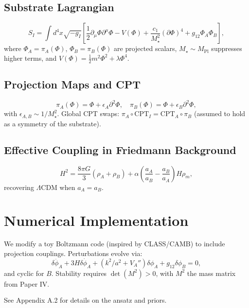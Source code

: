 \documentclass[11pt,a4paper]{article}
\begin{document}
\subsection{Substrate Lagrangian}
\begin{equation}
S_I = \int d^4x \sqrt{-g_I} \left[ \frac{1}{2} \partial_\mu \Phi \partial^\mu \Phi - V(\Phi) + \frac{c_1}{M_\star^2} (\partial \Phi)^4 + g_{12} \Phi_A \Phi_B \right],
\end{equation}
where $\Phi_A = \pi_A(\Phi)$, $\Phi_B = \pi_B(\Phi)$ are projected scalars, $M_\star \sim M_\mathrm{Pl}$ suppresses higher terms, and $V(\Phi) = \frac{1}{2} m^2 \Phi^2 + \lambda \Phi^4$.

\subsection{Projection Maps and CPT}
\begin{equation}
\pi_A(\Phi) = \Phi + \epsilon_A \partial^2 \Phi, \quad \pi_B(\Phi) = \Phi + \epsilon_B \partial^2 \Phi,
\end{equation}
with $\epsilon_{A,B} \sim 1/M_\star^2$. Global CPT swaps: $\pi_A \circ \mathrm{CPT}_I = \mathrm{CPT}_A \circ \pi_B$ (assumed to hold as a symmetry of the substrate).

\subsection{Effective Coupling in Friedmann Background}
\begin{equation}
H^2 = \frac{8\pi G}{3} (\rho_A + \rho_B) + \alpha \left( \frac{a_A}{a_B} - \frac{a_B}{a_A} \right) H \rho_m,
\end{equation}
recovering $\Lambda$CDM when $a_A = a_B$.

\section{Numerical Implementation}
We modify a toy Boltzmann code (inspired by CLASS/CAMB) to include projection couplings. Perturbations evolve via:
\begin{equation}
\ddot{\delta\phi_A} + 3H \dot{\delta\phi_A} + (k^2/a^2 + V_A'') \delta\phi_A + g_{12} \delta\phi_B = 0,
\end{equation}
and cyclic for $B$. Stability requires $\det(M^2) > 0$, with $M^2$ the mass matrix from Paper IV.

See Appendix A.2 for details on the ansatz and priors.
\end{document}
